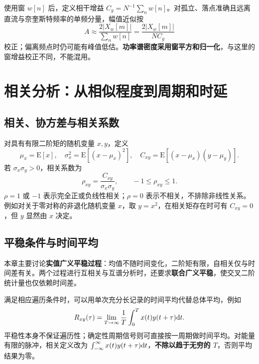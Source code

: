 使用窗 $w[n]$ 后，定义相干增益 $C_g=N^{-1}\sum_nw[n]$。对孤立、落点准确且远离直流与奈奎斯特频率的单频分量，幅值近似按
\[
A\approx\frac{2|X_w[m]|}{\sum_nw[n]}=\frac{2|X_w[m]|}{NC_g}
\]
校正；偏离频点时仍可能有峰值低估。\textbf{功率谱密度采用窗平方和归一化}，与这里的窗增益校正不同，不能混用。

\Needspace{8cm}
\section{相关分析：从相似程度到周期和时延}

\subsection{相关、协方差与相关系数}
\noindent{}

对具有有限二阶矩的随机变量 $x,y$，定义
\[
\mu_x=\mathrm E[x],\quad \sigma_x^2=\mathrm E[(x-\mu_x)^2],\quad
C_{xy}=\mathrm E[(x-\mu_x)(y-\mu_y)].
\]
若 $\sigma_x\sigma_y>0$，相关系数为
\[
\boxed{\rho_{xy}=\frac{C_{xy}}{\sigma_x\sigma_y}},\qquad -1\leq\rho_{xy}\leq1.
\]
$\rho=1$ 或 $-1$ 表示完全正或负线性相关；$\rho=0$ 表示不相关，不排除非线性关系。例如对关于零对称的非退化随机变量 $x$，取 $y=x^2$，在相关矩存在时可有 $C_{xy}=0$，但 $y$ 显然由 $x$ 决定。


\subsection{平稳条件与时间平均}
本章主要讨论\textbf{实值广义平稳过程}：均值不随时间变化，二阶矩有限，自相关仅与时间差有关。两个过程进行互相关与互谱分析时，还要求\textbf{联合广义平稳}，使交叉二阶统计量也仅依赖时间差。


满足相应遍历条件时，可以用单次充分长记录的时间平均代替总体平均，例如
\[
R_{xy}(\tau)=\lim_{T\to\infty}\frac1T\int_0^T x(t)y(t+\tau)\mathrm{d} t.
\]
平稳性本身不保证遍历性；确定性周期信号则可直接按一周期做时间平均。对能量有限的脉冲，相关定义改为 $\int_{-\infty}^{\infty}x(t)y(t+\tau)\mathrm{d} t$，\textbf{不除以趋于无穷的 $T$}，否则平均结果为零。

